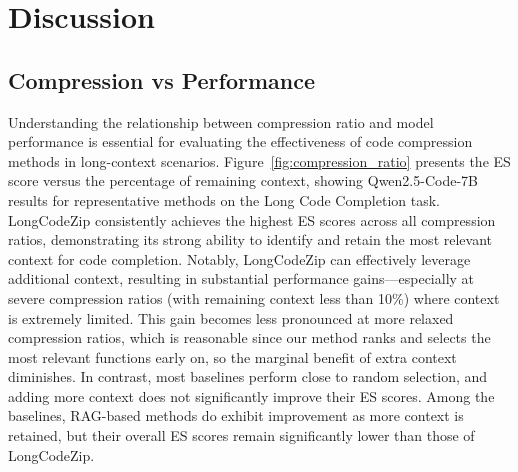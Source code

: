 \documentclass[10pt,conference]{IEEEtran}
\newcommand{\todoc}[2]{{\textcolor{#1}{\textbf{[#2]}}}}
\newcommand{\shi}[1]{\todoc{orange}{Shi: #1}}
\begin{document}
\section{Discussion}


\subsection{Compression vs Performance}
Understanding the relationship between compression ratio and model performance is essential for evaluating the effectiveness of code compression methods in long-context scenarios.
Figure~\ref{fig:compression_ratio} presents the ES score versus the percentage of remaining context, showing Qwen2.5-Code-7B results for representative methods on the Long Code Completion task. LongCodeZip consistently achieves the highest ES scores across all compression ratios, demonstrating its strong ability to identify and retain the most relevant context for code completion. Notably, LongCodeZip can effectively leverage additional context, resulting in substantial performance gains—especially at severe compression ratios (with remaining context less than 10\%) where context is extremely limited. This gain becomes less pronounced at more relaxed compression ratios, which is reasonable since our method ranks and selects the most relevant functions early on, so the marginal benefit of extra context diminishes. In contrast, most baselines perform close to random selection, and adding more context does not significantly improve their ES scores. Among the baselines, RAG-based methods do exhibit improvement as more context is retained, but their overall ES scores remain significantly lower than those of LongCodeZip.
\end{document}
